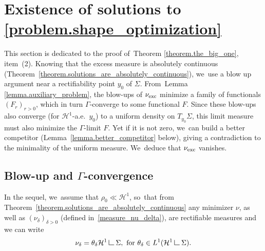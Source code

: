 \documentclass[10pt]{amsart}
\theoremstyle{definition}
\newcommand\LM[1]{\hbox{\vrule width.5pt \vbox to#1pt{\vfill \hrule width#1pt height.5pt}}}
\newcommand\LL{{\mathchoice {\>\LM7\>}{\>\LM7\>}{\,\LM5\,}{\,\LM{3.35}\,}}}
\newcommand{\mres}{\LL}
\newcommand\cH{\mathcal{H}}
\newcommand{\nuexc}{\nu_{\textup{exc}}}
\begin{document}
\section{Existence of solutions to \texorpdfstring{\eqref{problem.shape_optimization}}{eqref}}\label{section.blowup}
This section is dedicated to the proof of~Theorem \ref{theorem.the_big_one}, item~(2). Knowing
that the excess measure is absolutely continuous (Theorem~\ref{theorem.solutions_are_absolutely_continuous}), we~use
a blow up argument near a rectifiability point $y_0$ of $\Sigma$.
From~Lemma \ref{lemma.auxiliary_problem}, the blow-ups of $\nuexc$ minimize a family of functionals $(F_r)_{r > 0}$, which in turn $\Gamma$-converge to some functional $F$.
Since these blow-ups also converge (for $\cH^1$-a.e.~$y_0$) to a uniform density on $T_{y_0}\Sigma$, this limit measure must also minimize the $\Gamma$-limit $F$.
Yet if it is not zero, we~can build a better competitor (Lemma~\ref{lemma.better_competitor} below), giving a contradiction to the minimality of the uniform measure. We~deduce that $\nuexc$ vanishes.

\subsection{Blow-up and $\Gamma$-convergence}\label{sec.gamma_convergence}
In the sequel, we~assume that $\rho_0 \ll \mathcal{H}^1$, so~that from Theorem~\ref{theorem.solutions_are_absolutely_continuous} any minimizer $\nu$, as well as ${(\nu_\delta)}_{\delta > 0}$ (defined in~\eqref{measure_nu_delta}), are rectifiable measures and we can write
\[
\nu_\delta = \theta_\delta \mathcal{H}^1\mres \Sigma,
\text{ for }
\theta_\delta \in L^1(\cH^1\mres \Sigma).
\]
\end{document}
